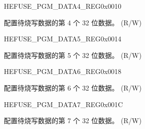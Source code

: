 \begin{register}{H}{EFUSE\_PGM\_DATA4\_REG}{0x0010}\label{regdesc:EFUSEPGMDATA4REG}
%
\regnewline%
\begin{regdesc}\begin{reglist}
\label{fielddesc:EFUSEPGMDATA4}\item [EFUSE\_PGM\_DATA\_4] 配置待烧写数据的第 4 个 32 位数据。 (R/W)
\end{reglist}\end{regdesc}
\end{register}


\begin{register}{H}{EFUSE\_PGM\_DATA5\_REG}{0x0014}\label{regdesc:EFUSEPGMDATA5REG}
%
\regnewline%
\begin{regdesc}\begin{reglist}
\label{fielddesc:EFUSEPGMDATA5}\item [EFUSE\_PGM\_DATA\_5] 配置待烧写数据的第 5 个 32 位数据。 (R/W)
\end{reglist}\end{regdesc}
\end{register}


\begin{register}{H}{EFUSE\_PGM\_DATA6\_REG}{0x0018}\label{regdesc:EFUSEPGMDATA6REG}
%
\regnewline%
\begin{regdesc}\begin{reglist}
\label{fielddesc:EFUSEPGMDATA6}\item [EFUSE\_PGM\_DATA\_6] 配置待烧写数据的第 6 个 32 位数据。 (R/W)
\end{reglist}\end{regdesc}
\end{register}


\begin{register}{H}{EFUSE\_PGM\_DATA7\_REG}{0x001C}\label{regdesc:EFUSEPGMDATA7REG}
%
\regnewline%
\begin{regdesc}\begin{reglist}
\label{fielddesc:EFUSEPGMDATA7}\item [EFUSE\_PGM\_DATA\_7] 配置待烧写数据的第 7 个 32 位数据。 (R/W)
\end{reglist}\end{regdesc}
\end{register}


